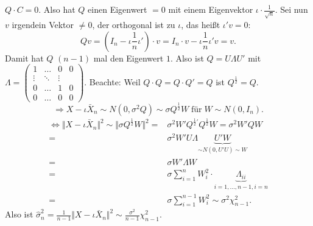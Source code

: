 \documentclass[10pt]{article}
\newcommand{\sni}{\sum_{i=1}^{n}} %
\newcommand{\halb}{\frac{1}{2}} %
\newenvironment{BSP}[1][]
{\begin{Beispiel}[frametitle=#1]}{\end{Beispiel}}
\begin{document}
\begin{BSP}[Beispiel 4.0.2 (Mittelwertschätzer)]
				$Q \cdot C = 0$. Also hat $Q$ einen Eigenwert $=0$ mit einem Eigenvektor $\iota \cdot \frac{1}{\sqrt{n}}$. Sei nun $v$ irgendein Vektor $\neq 0$, der orthogonal ist zu $\iota$, das heißt $\iota'v=0$:
				\begin{equation*}
					Qv = \left(I_n - \iota \frac{1}{n}\iota'\right) \cdot v = I_n \cdot v - \iota \frac{1}{n}\iota'v = v.
				\end{equation*}
				Damit hat $Q$ $(n-1)$ mal den Eigenwert $1$. Also ist $Q = U \Lambda U'$ mit $\Lambda = \begin{pmatrix}
					1 & \ldots & 0 & 0\\
					\vdots & \ddots & \vdots \\
					0 & \ldots & 1 & 0\\
					0 & \ldots & 0 & 0
				\end{pmatrix}$. Beachte: Weil $Q \cdot Q = Q \cdot Q' = Q$ ist $Q^{\halb} = Q$.
				\begin{equation*}
					\Longrightarrow X - \iota \bar{X}_n \sim N(0, \sigma^2 Q) \sim \sigma Q^{\halb} W \; \text{für} \; W\sim N(0,I_n).
				\end{equation*}
				\begin{equation*}
					\begin{split}
						\Leftrightarrow \Vert X - \iota \bar{X}_n \Vert^2 \sim \Vert \sigma Q^{\halb}W\Vert^2 =& \sigma^2 W' Q^{\halb'} Q^{\halb}W = \sigma^2 W' Q W\\
						=& \sigma^2 W'U\Lambda \underbrace{U'W}_{\sim N(0,U'U) \sim W}\\
						=& \sigma W' \Lambda W\\
						=& \sigma \sni W_i^2 \cdot \underbrace{\Lambda_{ii}}_{i = 1, \ldots, n-1, i=n}\\
						=& \sigma \sum_{i =1}^{n-1} W_i^2 \sim \sigma^2 \chi^2_{n-1}.
					\end{split}
				\end{equation*}
				Also ist $\hat{\sigma}^2_n = \frac{1}{n-1} \Vert X - \iota \bar{X}_n\Vert^2 \sim \frac{\sigma^2}{n-1} \chi^2_{n-1}$.
			\end{BSP}
			
\end{document}
